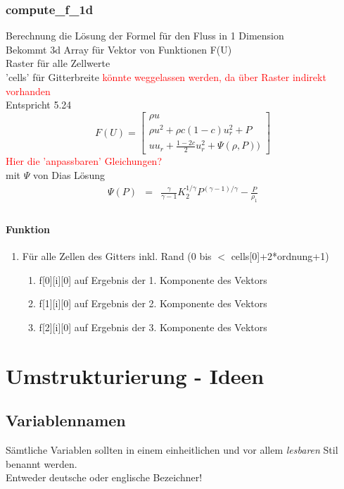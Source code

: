 \documentclass[12pt]{article}
\begin{document}
\subsubsection{compute\_f\_1d}
Berechnung die Lösung der Formel für den Fluss in 1 Dimension\\
Bekommt 3d Array für Vektor von Funktionen F(U) \\
Raster für alle Zellwerte\\
'cells' für Gitterbreite \textcolor{red}{könnte weggelassen werden, da über Raster indirekt vorhanden}\\
Entspricht 5.24
\begin{equation}
F(U) = \left[\begin{array}{c}\rho u \\[2mm] 
\rho u^2 + \rho c (1-c) u_r^2 + P\\[2mm] 
uu_r + \frac{1-2c}{2} u_r^2 + \Psi(\rho,P))\end{array}\right]
\end{equation}
\textcolor{red}{Hier die 'anpassbaren' Gleichungen?}\\
mit $\Psi$ von Dias Lösung\\
\begin{eqnarray*}
	\Psi(P) &=& \frac{\gamma}{\gamma-1} K_2^{1/\gamma} P^{(\gamma-1)/\gamma} -
	\frac{P}{\rho_1}\\
\end{eqnarray*}
\renewcommand{\labelenumi}{\alph{enumi})} 
\paragraph{Funktion}
\begin{enumerate}
	\item Für alle Zellen des Gitters inkl. Rand (0 bis $<$ cells[0]+2*ordnung+1)
	\begin{enumerate}
		\item f[0][i][0] auf Ergebnis der 1. Komponente des Vektors
		\item f[1][i][0] auf Ergebnis der 2. Komponente des Vektors
		\item f[2][i][0] auf Ergebnis der 3. Komponente des Vektors
	\end{enumerate}
\end{enumerate}

\section{Umstrukturierung - Ideen}
\subsection{Variablennamen}
Sämtliche Variablen sollten in einem einheitlichen und vor allem {\em lesbaren} Stil benannt werden. \\
Entweder deutsche oder englische Bezeichner!
\end{document}
